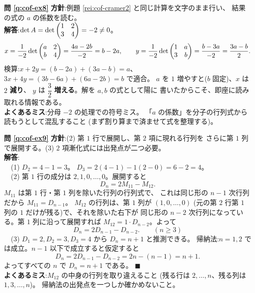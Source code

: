 \bigskip
\noindent\textbf{問 \ref{q:cof-ex8}}\quad
\textbf{方針}:例題 \ref{rei:cof-cramer2} と同じ計算を文字のまま行い、
結果の式の $a$ の係数を読む。\\
\textbf{解答}:$\det A = \det \begin{pmatrix}1 & 2 \\ 3 & 4\end{pmatrix} = -2 \neq 0$。
\[
x = \frac{1}{-2}\det \begin{pmatrix}a & 2 \\ b & 4\end{pmatrix} = \frac{4a - 2b}{-2} = b - 2a,
\qquad
y = \frac{1}{-2}\det \begin{pmatrix}1 & a \\ 3 & b\end{pmatrix} = \frac{b - 3a}{-2} = \frac{3a - b}{2}.
\]
検算:$x + 2y = (b - 2a) + (3a - b) = a$、
$3x + 4y = (3b - 6a) + (6a - 2b) = b$ で適合。
$a$ を $1$ 増やすと($b$ 固定)、$x$ は $2$ \textbf{減り}、
$y$ は $\dfrac{3}{2}$ \textbf{増える}。解を $a, b$ の式として陽に
書いたからこそ、即座に読み取れる情報である。\\
\textbf{よくあるミス}:分母 $-2$ の処理での符号ミス。
「$a$ の係数」を分子の行列式から読もうとして混乱すること
(まず割り算まで済ませて式を整理する)。

\bigskip
\noindent\textbf{問 \ref{q:cof-ex9}}\quad
\textbf{方針}:(2) 第 $1$ 行で展開し、第 $2$ 項に現れる行列を
さらに第 $1$ 列で展開する。(3) $2$ 項漸化式には出発点が二つ必要。\\
\textbf{解答}:\\
　(1) $D_2 = 4 - 1 = 3$。
$D_3 = 2(4 - 1) - 1(2 - 0) = 6 - 2 = 4$。\\
　(2) 第 $1$ 行の成分は $2, 1, 0, \dots, 0$。展開すると
\[
D_n = 2 M_{11} - M_{12}.
\]
$M_{11}$ は第 $1$ 行・第 $1$ 列を除いた行列の行列式で、
これは同じ形の $n-1$ 次行列だから $M_{11} = D_{n-1}$。
$M_{12}$ の行列は、第 $1$ 列が $(1, 0, \dots, 0)$
(元の第 $2$ 行第 $1$ 列の $1$ だけが残る)で、それを除いた右下が
同じ形の $n-2$ 次行列になっている。第 $1$ 列に沿って展開すれば
$M_{12} = 1 \cdot D_{n-2}$。よって
\[
D_n = 2D_{n-1} - D_{n-2}. \qquad (n \ge 3)
\]
　(3) $D_1 = 2, D_2 = 3, D_3 = 4$ から $D_n = n + 1$ と推測できる。
帰納法:$n = 1, 2$ では成立。$n - 1$ 以下で成立すると仮定すると
\[
D_n = 2D_{n-1} - D_{n-2} = 2n - (n - 1) = n + 1.
\]
よってすべての $n$ で $D_n = n + 1$ である。 $\blacksquare$\\
\textbf{よくあるミス}:$M_{12}$ の中身の行列を取り違えること
(残る行は $2, \dots, n$、残る列は $1, 3, \dots, n$)。
帰納法の出発点を一つしか確かめないこと。

